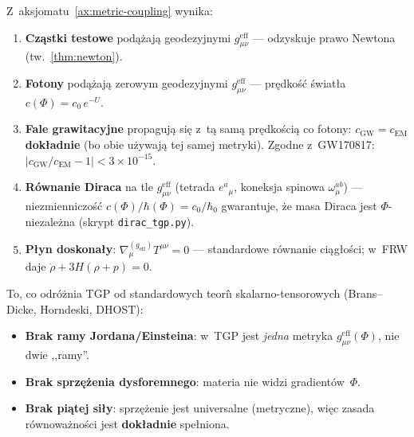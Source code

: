 \begin{proposition}%
\label{prop:coupling-consequences}
Z~aksjomatu~\ref{ax:metric-coupling} wynika:
\begin{enumerate}[nosep]
  \item \textbf{Cz\k{a}stki testowe} pod\k{a}\.zaj\k{a} geodezyjnymi
    $g_{\mu\nu}^{\mathrm{eff}}$ --- odzyskuje prawo Newtona
    (tw.~\ref{thm:newton}).
  \item \textbf{Fotony} pod\k{a}\.zaj\k{a} zerowym geodezyjnymi
    $g_{\mu\nu}^{\mathrm{eff}}$ --- pr\k{e}dko\'s\'c \'swiat\l{}a
    $c(\Phi) = c_0\,e^{-U}$.
  \item \textbf{Fale grawitacyjne} propaguj\k{a} si\k{e} z~t\k{a}
    sam\k{a} pr\k{e}dko\'sci\k{a} co fotony:
    $c_{\mathrm{GW}} = c_{\mathrm{EM}}$ \textbf{dok\l{}adnie}
    (bo obie u\.zywaj\k{a} tej samej metryki).
    Zgodne z~GW170817: $|c_{\mathrm{GW}}/c_{\mathrm{EM}} - 1|
    < 3\times 10^{-15}$.
  \item \textbf{R\'ownanie Diraca} na tle $g_{\mu\nu}^{\mathrm{eff}}$
    (tetrada $e^a{}_\mu$, koneksja spinowa $\omega_\mu^{ab}$)
    --- niezmienniczo\'s\'c $c(\Phi)/\hbar(\Phi) = c_0/\hbar_0$
    gwarantuje, \.ze masa Diraca jest $\Phi$-niezale\.zna
    (skrypt \texttt{dirac\_tgp.py}).
  \item \textbf{P\l{}yn doskona\l{}y}:
    $\nabla_\mu^{(g_{\mathrm{eff}})} T^{\mu\nu} = 0$ ---
    standardowe r\'ownanie ci\k{a}g\l{}o\'sci; w~FRW daje
    $\dot\rho + 3H(\rho + p) = 0$.
\end{enumerate}
\end{proposition}

\begin{remark}%
\label{rem:one-coupling}
To, co odr\'o\.znia TGP od standardowych teori\`\i{}
skalarno-tensorowych (Brans--Dicke, Horndeski, DHOST):
\begin{itemize}[nosep]
  \item \textbf{Brak ramy Jordana/Einsteina}: w~TGP jest \emph{jedna}
    metryka $g_{\mu\nu}^{\mathrm{eff}}(\Phi)$, nie dwie ,,ramy''.
  \item \textbf{Brak sprz\k{e}\.zenia dysforemnego}: materia nie
    widzi gradient\'ow~$\Phi$.
  \item \textbf{Brak pi\k{a}tej si\l{}y}: sprz\k{e}\.zenie jest
    universalne (metryczne), wi\k{e}c zasada r\'ownowa\.zno\'sci
    jest \textbf{dok\l{}adnie} spe\l{}niona.
\end{itemize}
\end{remark}

